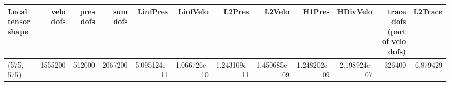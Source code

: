 \begin{tabular}{lrrrrrrrrrrr}
\toprule
Local tensor shape &  velo dofs &  pres dofs &  sum dofs &     LinfPres &     LinfVelo &       L2Pres &       L2Velo &       H1Pres &     HDivVelo &  trace dofs (part of velo dofs) &  L2Trace \\
\midrule
        (575, 575) &    1555200 &     512000 &   2067200 & 5.095124e-11 & 1.066726e-10 & 1.243109e-11 & 1.450685e-09 & 1.248202e-09 & 2.198924e-07 &                          326400 & 6.879429 \\
\bottomrule
\end{tabular}
